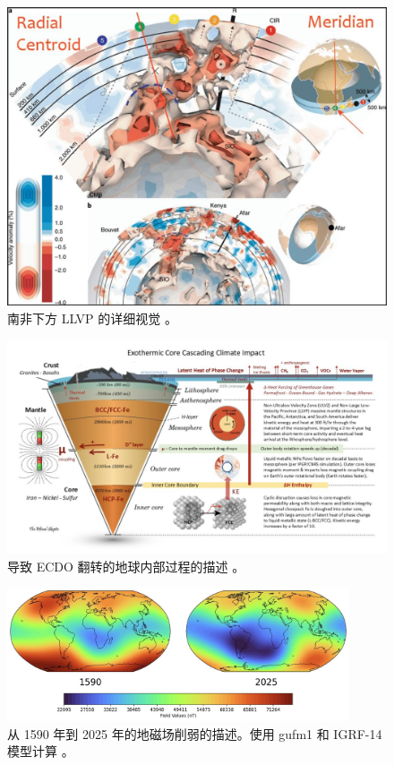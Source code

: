 \documentclass[10pt,twocolumn,letterpaper]{article}
\begin{document}
\begin{figure}[t]
\begin{center}
   \includegraphics[width=1\linewidth]{llvp.jpg}
\end{center}
   \caption{南非下方 LLVP 的详细视觉 \cite{28}。}
\label{fig:12}
\label{fig:onecol}
\end{figure}

\begin{figure}[t]
\begin{center}
\includegraphics[width=1\textwidth]{layers.jpg}
\end{center}
   \caption{导致 ECDO 翻转的地球内部过程的描述 \cite{129}。}
\label{fig:11}
\end{figure}

\begin{figure}[b]
\begin{center}
\includegraphics[width=0.9\textwidth]{saa.jpg}
\end{center}
   \caption{从 1590 年到 2025 年的地磁场削弱的描述。使用 gufm1 和 IGRF-14 模型计算 \cite{125,126}。}
\label{fig:14}
\end{figure}
\end{document}
